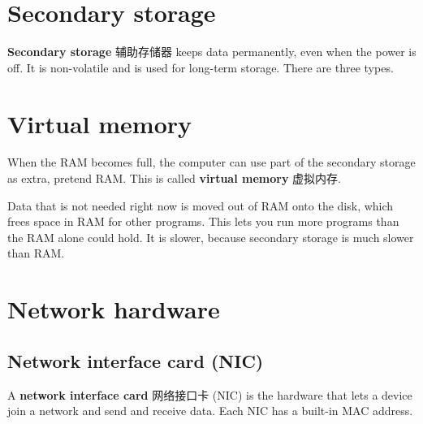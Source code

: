 \documentclass[11pt]{article}
\begin{document}
\section*{Secondary storage}

\textbf{Secondary storage} 辅助存储器 keeps data permanently, even when the power is off. It is non-volatile and is used for long-term storage. There are three types.

\begin{center}
\end{center}

\section*{Virtual memory}

When the RAM becomes full, the computer can use part of the secondary storage as extra, pretend RAM. This is called \textbf{virtual memory} 虚拟内存.

Data that is not needed right now is moved out of RAM onto the disk, which frees space in RAM for other programs. This lets you run more programs than the RAM alone could hold. It is slower, because secondary storage is much slower than RAM.

\section*{Network hardware}

\subsection*{Network interface card (NIC)}

A \textbf{network interface card} 网络接口卡 (NIC) is the hardware that lets a device join a network and send and receive data. Each NIC has a built-in MAC address.
\end{document}
